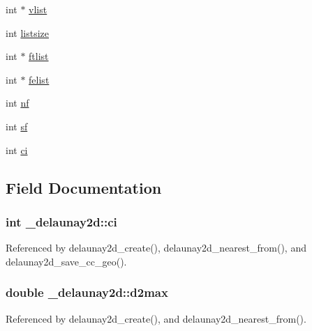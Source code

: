 \begin{DoxyCompactItemize}
\item 
int $\ast$ \hyperlink{struct__delaunay2d_a427a53f03edcd3a7d411f6985d4bda19}{vlist}
\item 
int \hyperlink{struct__delaunay2d_aba24fa0c4a9841f5aafe0b883b7f63db}{listsize}
\item 
int $\ast$ \hyperlink{struct__delaunay2d_aab5c78dc17e4974199fb84d94cebb76a}{ftlist}
\item 
int $\ast$ \hyperlink{struct__delaunay2d_aa35af1842ca721041a784d0c8e8be3af}{felist}
\item 
int \hyperlink{struct__delaunay2d_aff143abc887899d753b1ae6880def850}{nf}
\item 
int \hyperlink{struct__delaunay2d_a96a3fa581638e23939315cc0b3c1a8cb}{sf}
\item 
int \hyperlink{struct__delaunay2d_ad2ce95e457b0f00e2d29f21e9103cbbb}{ci}
\end{DoxyCompactItemize}


\subsection{Field Documentation}
\subsubsection[{\texorpdfstring{ci}{ci}}]{\setlength{\rightskip}{0pt plus 5cm}int \+\_\+delaunay2d\+::ci}\hypertarget{struct__delaunay2d_ad2ce95e457b0f00e2d29f21e9103cbbb}{}\label{struct__delaunay2d_ad2ce95e457b0f00e2d29f21e9103cbbb}


Referenced by delaunay2d\+\_\+create(), delaunay2d\+\_\+nearest\+\_\+from(), and delaunay2d\+\_\+save\+\_\+cc\+\_\+geo().

\subsubsection[{\texorpdfstring{d2max}{d2max}}]{\setlength{\rightskip}{0pt plus 5cm}double \+\_\+delaunay2d\+::d2max}\hypertarget{struct__delaunay2d_a2f1977f93092cb3662893a1f7096d9e4}{}\label{struct__delaunay2d_a2f1977f93092cb3662893a1f7096d9e4}


Referenced by delaunay2d\+\_\+create(), and delaunay2d\+\_\+nearest\+\_\+from().


